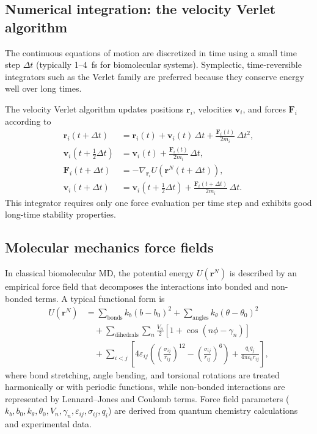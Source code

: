 \documentclass[12pt,a4paper]{article}
\begin{document}
\subsection{Numerical integration: the velocity Verlet algorithm}

The continuous equations of motion are discretized in time using a small time step \(\Delta t\) (typically 1--4~fs for biomolecular systems). Symplectic, time-reversible integrators such as the Verlet family are preferred because they conserve energy well over long times.\cite{FrenkelSmit2002}

The velocity Verlet algorithm updates positions \(\mathbf{r}_i\), velocities \(\mathbf{v}_i\), and forces \(\mathbf{F}_i\) according to
\begin{align}
\mathbf{r}_i(t+\Delta t) &= \mathbf{r}_i(t) + \mathbf{v}_i(t)\,\Delta t + \frac{\mathbf{F}_i(t)}{2m_i}\,\Delta t^2, \\
\mathbf{v}_i(t+\tfrac{1}{2}\Delta t) &= \mathbf{v}_i(t) + \frac{\mathbf{F}_i(t)}{2m_i}\,\Delta t, \\
\mathbf{F}_i(t+\Delta t) &= -\nabla_{\mathbf{r}_i} U(\mathbf{r}^N(t+\Delta t)), \\
\mathbf{v}_i(t+\Delta t) &= \mathbf{v}_i(t+\tfrac{1}{2}\Delta t) + \frac{\mathbf{F}_i(t+\Delta t)}{2m_i}\,\Delta t.
\end{align}
This integrator requires only one force evaluation per time step and exhibits good long-time stability properties.

\subsection{Molecular mechanics force fields}

In classical biomolecular MD, the potential energy \(U(\mathbf{r}^N)\) is described by an empirical force field that decomposes the interactions into bonded and non-bonded terms.\cite{Cornell1995,MacKerell1998} A typical functional form is
\begin{align}
U(\mathbf{r}^N) &= \sum_{\text{bonds}} k_b (b - b_0)^2
+ \sum_{\text{angles}} k_\theta (\theta - \theta_0)^2 \nonumber \\
&\quad + \sum_{\text{dihedrals}} \sum_n \frac{V_n}{2} \left[1 + \cos(n\phi - \gamma_n)\right] \nonumber\\
&\quad + \sum_{i<j} \left[4\varepsilon_{ij} \left( \left(\frac{\sigma_{ij}}{r_{ij}}\right)^{12} - \left(\frac{\sigma_{ij}}{r_{ij}}\right)^6 \right)
+ \frac{q_i q_j}{4\pi\varepsilon_0 r_{ij}} \right],
\end{align}
where bond stretching, angle bending, and torsional rotations are treated harmonically or with periodic functions, while non-bonded interactions are represented by Lennard--Jones and Coulomb terms. Force field parameters (\(k_b, b_0, k_\theta, \theta_0, V_n, \gamma_n, \varepsilon_{ij}, \sigma_{ij}, q_i\)) are derived from quantum chemistry calculations and experimental data.
\end{document}
